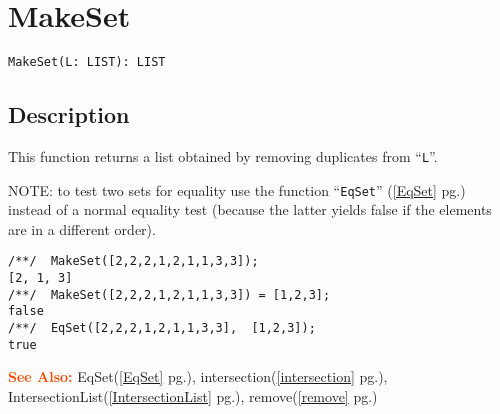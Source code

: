 \documentclass[a4paper]{mybook}
\newenvironment{command}{}{} %
\newcommand\SeeAlso{\par\textcolor{OrangeRed}{\textbf{\large See Also: }}}
\begin{document}
\section{MakeSet}
\label{MakeSet}
\begin{command} %


\begin{Verbatim}[label=syntax, rulecolor=\color{MidnightBlue},
frame=single]
MakeSet(L: LIST): LIST
\end{Verbatim}


\subsection*{Description}

This function returns a list obtained by removing duplicates from ``\verb&L&''.
\par 
NOTE: to test two sets for equality use the function ``\verb&EqSet&'' (\ref{EqSet} pg.\pageref{EqSet})
instead of a normal equality test (because the latter yields false if
the elements are in a different order).
\begin{Verbatim}[label=example, rulecolor=\color{PineGreen}, frame=single]
/**/  MakeSet([2,2,2,1,2,1,1,3,3]);
[2, 1, 3]
/**/  MakeSet([2,2,2,1,2,1,1,3,3]) = [1,2,3];
false
/**/  EqSet([2,2,2,1,2,1,1,3,3],  [1,2,3]);
true
\end{Verbatim}


\SeeAlso %
  EqSet(\ref{EqSet} pg.\pageref{EqSet}), 
    intersection(\ref{intersection} pg.\pageref{intersection}), 
    IntersectionList(\ref{IntersectionList} pg.\pageref{IntersectionList}), 
    remove(\ref{remove} pg.\pageref{remove})
\end{command} %
\end{document}
